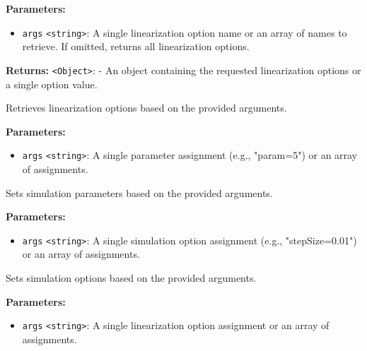 \documentclass[12pt,a4paper]{article}
\begin{document}
\noindent \textbf{Parameters:}
\begin{itemize}
  \item \texttt{args} \texttt{<string>}: A single linearization option name or an array of names to retrieve. If omitted, returns all linearization options.
\end{itemize}

\noindent \textbf{Returns:} \texttt{<Object>}: - An object containing the requested linearization options or a single option value.

\noindent Retrieves linearization options based on the provided arguments.

\vspace{5mm}
\noindent {}


\noindent \textbf{Parameters:}
\begin{itemize}
  \item \texttt{args} \texttt{<string>}: A single parameter assignment (e.g., "param=5") or an array of assignments.
\end{itemize}

\noindent Sets simulation parameters based on the provided arguments.

\vspace{5mm}
\noindent {}


\noindent \textbf{Parameters:}
\begin{itemize}
  \item \texttt{args} \texttt{<string>}: A single simulation option assignment (e.g., "stepSize=0.01") or an array of assignments.
\end{itemize}

\noindent Sets simulation options based on the provided arguments.

\vspace{5mm}
\noindent {}


\noindent \textbf{Parameters:}
\begin{itemize}
  \item \texttt{args} \texttt{<string>}: A single linearization option assignment or an array of assignments.
\end{itemize}
\end{document}
